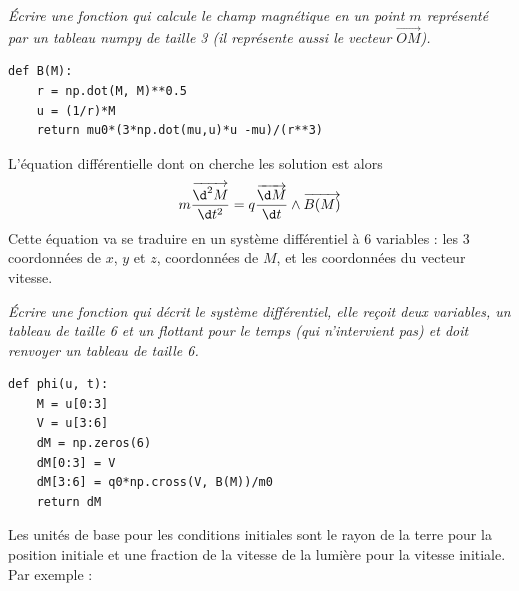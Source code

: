 \begin{Exercise}\it
Écrire une fonction  qui calcule le champ magnétique en un point $m$ représenté par un tableau {\sc numpy} de taille 3 (il représente aussi le vecteur $\overrightarrow{OM}$). 
\end{Exercise}
\begin{Answer}
\begin{lstlisting}
def B(M):
    r = np.dot(M, M)**0.5 
    u = (1/r)*M
    return mu0*(3*np.dot(mu,u)*u -mu)/(r**3)
\end{lstlisting}
\end{Answer}
L'équation différentielle dont on cherche les solution est alors
\[m\frac{\overrightarrow{\d^2 M}}{\d t^2} = q\frac{\overrightarrow{\d M}}{\d t}\wedge \overrightarrow{B(M)}\]
Cette équation va se traduire en un système différentiel à 6 variables : les 3 coordonnées de $x$, $y$ et $z$, coordonnées de $M$, et les coordonnées du vecteur vitesse. 
\begin{Exercise}\it
Écrire une fonction  qui décrit le système différentiel, elle reçoit deux variables, un tableau de taille 6 et un flottant pour le temps (qui n'intervient pas) et doit renvoyer un tableau de taille 6.  
\end{Exercise}
\begin{Answer}
\begin{lstlisting}
def phi(u, t):
    M = u[0:3]
    V = u[3:6]
    dM = np.zeros(6)
    dM[0:3] = V
    dM[3:6] = q0*np.cross(V, B(M))/m0
    return dM
\end{lstlisting}
\end{Answer}
Les unités de base pour les conditions initiales sont le rayon de la terre pour la position initiale et une fraction de la vitesse de la lumière pour la vitesse initiale. Par exemple :
